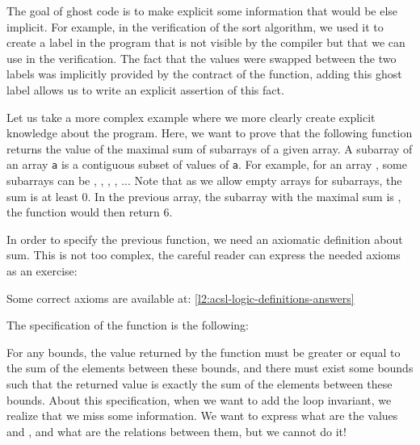 

The goal of ghost code is to make explicit some information that would be else
implicit. For example, in the verification of the sort algorithm, we used it
to create a label in the program that is not visible by the compiler but that
we can use in the verification. The fact that the values were swapped between the
two labels was implicitly provided by the contract of the function, adding this
ghost label allows us to write an explicit assertion of this fact.



Let us take a more complex example where we more clearly create explicit
knowledge about the program. Here, we want to prove that the
following function returns the value of the maximal sum of subarrays of
a given array. A subarray of an array \texttt{a} is a contiguous subset
of values of \texttt{a}. For example, for an array ,
some subarrays can be
\CodeInline{\{\}}, , 
, , ... Note that as we allow
empty arrays for subarrays, the sum is at least 0. In the previous
array, the subarray with the maximal sum is ,
the function would then return 6.






In order to specify the previous function, we need an axiomatic
definition about sum. This is not too complex, the careful reader
can express the needed axioms as an exercise:






Some correct axioms are available at: \ref{l2:acsl-logic-definitions-answers}



The specification of the function is the following:






For any bounds, the value returned by the function must be greater or
equal to the sum of the elements between these bounds, and there must
exist some bounds such that the returned value is exactly the sum of the
elements between these bounds. About this specification, when we want to
add the loop invariant, we realize that we miss some information.
We want to express what are the values  and ,
and what are the relations between them, but we cannot do it!


